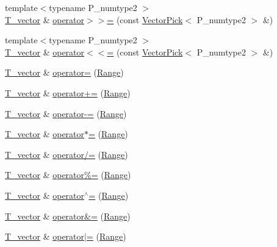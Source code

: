 \begin{DoxyCompactItemize}
{\footnotesize template$<$typename P\+\_\+numtype2 $>$ }\\\hyperlink{classVector_a29e279edfeac4d65aad0d814c05cfaf0}{T\+\_\+vector} \& \hyperlink{classVector_ad31ea231dc8c436a3e432138f2d641f4}{operator$>$$>$=} (const \hyperlink{classVectorPick}{Vector\+Pick}$<$ P\+\_\+numtype2 $>$ \&)
\item 
{\footnotesize template$<$typename P\+\_\+numtype2 $>$ }\\\hyperlink{classVector_a29e279edfeac4d65aad0d814c05cfaf0}{T\+\_\+vector} \& \hyperlink{classVector_aceca18cc1a72fcd0430014a9752b3061}{operator$<$$<$=} (const \hyperlink{classVectorPick}{Vector\+Pick}$<$ P\+\_\+numtype2 $>$ \&)
\item 
\hyperlink{classVector_a29e279edfeac4d65aad0d814c05cfaf0}{T\+\_\+vector} \& \hyperlink{classVector_aaca1fa58ddc9aa739620d22ca1bb83ea}{operator=} (\hyperlink{classRange}{Range})
\item 
\hyperlink{classVector_a29e279edfeac4d65aad0d814c05cfaf0}{T\+\_\+vector} \& \hyperlink{classVector_aa3881a250434c6fdec203ff205d6a712}{operator+=} (\hyperlink{classRange}{Range})
\item 
\hyperlink{classVector_a29e279edfeac4d65aad0d814c05cfaf0}{T\+\_\+vector} \& \hyperlink{classVector_a7140d57af0a545292677eef0b8d9e5dc}{operator-\/=} (\hyperlink{classRange}{Range})
\item 
\hyperlink{classVector_a29e279edfeac4d65aad0d814c05cfaf0}{T\+\_\+vector} \& \hyperlink{classVector_a18901186f706c6a70ad87e56102c6566}{operator$\ast$=} (\hyperlink{classRange}{Range})
\item 
\hyperlink{classVector_a29e279edfeac4d65aad0d814c05cfaf0}{T\+\_\+vector} \& \hyperlink{classVector_ac9cff263e54f9b65ea8704877d7d1ea2}{operator/=} (\hyperlink{classRange}{Range})
\item 
\hyperlink{classVector_a29e279edfeac4d65aad0d814c05cfaf0}{T\+\_\+vector} \& \hyperlink{classVector_a707db0bb3e5ca79ad54fac471ffba04a}{operator\%=} (\hyperlink{classRange}{Range})
\item 
\hyperlink{classVector_a29e279edfeac4d65aad0d814c05cfaf0}{T\+\_\+vector} \& \hyperlink{classVector_ae8c33b3ef8fe12afaee6916f3131ccfd}{operator$^\wedge$=} (\hyperlink{classRange}{Range})
\item 
\hyperlink{classVector_a29e279edfeac4d65aad0d814c05cfaf0}{T\+\_\+vector} \& \hyperlink{classVector_afe952f0c4dfbe7c8bf95fad84616fed2}{operator\&=} (\hyperlink{classRange}{Range})
\item 
\hyperlink{classVector_a29e279edfeac4d65aad0d814c05cfaf0}{T\+\_\+vector} \& \hyperlink{classVector_aa309513c4e9d7e283d00968e6581be10}{operator$\vert$=} (\hyperlink{classRange}{Range})

\end{DoxyCompactItemize}
